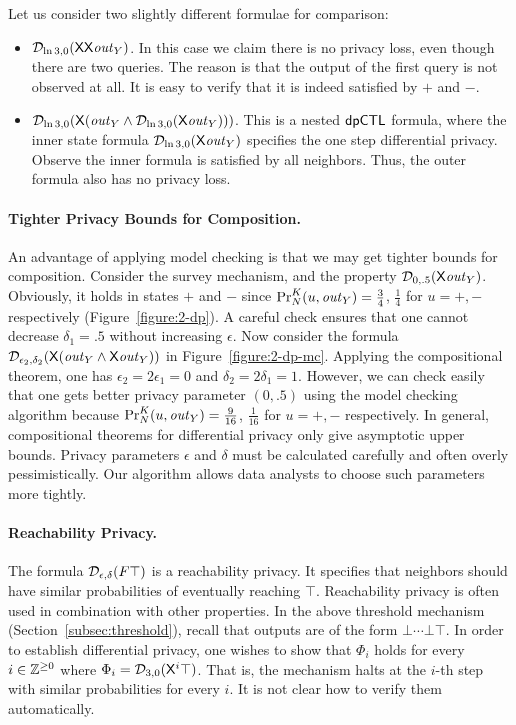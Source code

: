 Let us consider two slightly different formulae for comparison:
\begin{itemize}
\item $\dpriv{\ln 3}{0} (\X \X \mathit{out}_Y)$. In this case we claim
  there is no privacy loss, even though there are two queries. The reason is that the output of the first query is not observed at all. It is easy to verify that it is indeed satisfied by $+$ and $-$.
\item $\dpriv{\ln 3}{0} (\X (\mathit{out}_Y\wedge \dpriv{\ln 3}{0}(\X \mathit{out}_Y)))$. This is a nested $\dpCTL$ formula, where the inner state formula $\dpriv{\ln 3}{0}(\X \mathit{out}_Y)$ specifies the one step differential privacy. Observe the inner formula is satisfied by all neighbors. Thus, the outer formula also has no privacy loss.
\end{itemize}

\paragraph{Tighter Privacy Bounds for Composition.}
An advantage of applying model checking is that we may get tighter
bounds for composition. Consider the survey mechanism, and the
property $\dpriv{0}{.5} (\X \mathit{out}_Y)$. Obviously, it holds in
states $+$ and $-$ since $\myPr{u}{K}{N}{\mathit{out}_Y} =
\frac{3}{4}$, $\frac{1}{4}$ for $u = +, -$ respectively (Figure~\ref{figure:2-dp}). A careful check ensures that one cannot decrease  $\delta_1=.5$ without increasing $\epsilon$.
Now consider the formula $\dpriv{\epsilon_2}{\delta_2} (\X
(\mathit{out}_Y\wedge \X \mathit{out}_Y))$ in
Figure~\ref{figure:2-dp-mc}. Applying the
compositional theorem, one has $\epsilon_2=2\epsilon_1=0$ and
$\delta_2=2\delta_1=1$. However, we can check easily that one gets
better privacy parameter $(0,.5)$ using the model checking algorithm
because $\myPr{u}{K}{N}{\mathit{out}_Y} = \frac{9}{16}$,
$\frac{1}{16}$ for $u = +, -$ respectively.
In general, compositional theorems for differential privacy only give
asymptotic upper bounds. Privacy parameters $\epsilon$ and $\delta$
must be calculated carefully and often overly pessimistically. Our
algorithm allows data analysts to choose such parameters more
tightly.


\paragraph{Reachability Privacy.}
The formula $\dpriv{\epsilon}{\delta}(F \top)$ is a reachability privacy. It specifies that neighbors should have similar probabilities of eventually reaching $\top$. Reachability privacy is often used in combination with other properties.
In the above threshold mechanism (Section~\ref{subsec:threshold}),
recall that outputs are of the form $\bot \cdots \bot \top$. In order
to establish differential privacy, one wishes to show that $\Phi_i$
holds for every $i \in \bbfZ^{\geq 0}$ where $\Phi_i =
\dpriv{3}{0}(\X^i \top)$. That is, the mechanism halts at the $i$-th
step with similar probabilities for every $i$. 
It is not clear how to verify them automatically. 

